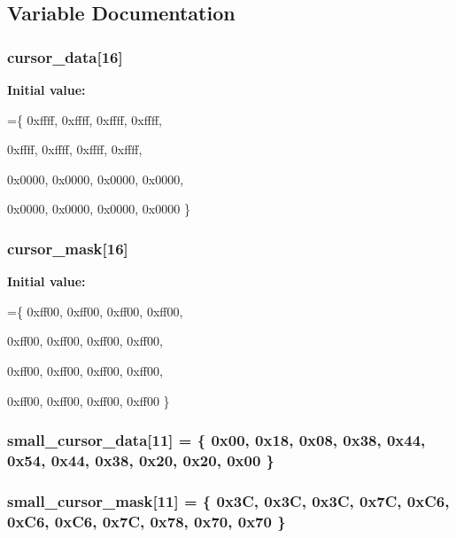 \subsection{Variable Documentation}
\subsubsection[{cursor\+\_\+data}]{ cursor\+\_\+data[16]}\label{testcursor_8c_a2b83165190f3b02b50039781c368caa0}
{\bfseries Initial value\+:}
\begin{DoxyCode}
=\{
    0xffff,
    0xffff,
    0xffff,
    0xffff, 

    0xffff,
    0xffff,
    0xffff,
    0xffff, 

    0x0000,
    0x0000,
    0x0000,
    0x0000,

    0x0000,
    0x0000,
    0x0000,
    0x0000
\}
\end{DoxyCode}
\subsubsection[{cursor\+\_\+mask}]{ cursor\+\_\+mask[16]}\label{testcursor_8c_a7079b60a51f811b44e00e84be1ff47fa}
{\bfseries Initial value\+:}
\begin{DoxyCode}
=\{
    0xff00,
    0xff00,
    0xff00,
    0xff00,

    0xff00,
    0xff00,
    0xff00,
    0xff00,

    0xff00,
    0xff00,
    0xff00,
    0xff00,

    0xff00,
    0xff00,
    0xff00,
    0xff00
\}
\end{DoxyCode}
\subsubsection[{small\+\_\+cursor\+\_\+data}]{ small\+\_\+cursor\+\_\+data[11] = \{ 0x00, 0x18, 0x08, 0x38, 0x44, 0x54, 0x44, 0x38, 0x20, 0x20, 0x00 \}}\label{testcursor_8c_acf532a660501718187d231aab5f92f79}
\subsubsection[{small\+\_\+cursor\+\_\+mask}]{ small\+\_\+cursor\+\_\+mask[11] = \{ 0x3\+C, 0x3\+C, 0x3\+C, 0x7\+C, 0x\+C6, 0x\+C6, 0x\+C6, 0x7\+C, 0x78, 0x70, 0x70 \}}\label{testcursor_8c_a5d4b21ebc9d83ef662c65f4152c340d6}
